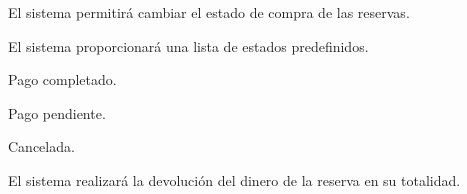\begin{enumitem}[label=\bfseries{RAdm \arabic*.},leftmargin=*]
	\begin{enumitem}[label*=\bfseries{\arabic*.}]
		\item El sistema permitirá cambiar el estado de compra de las reservas.
		\begin{enumitem}[label*=\bfseries{\arabic*.}]
			\item El sistema proporcionará una lista de estados predefinidos.
			\begin{enumitem}[label*=\bfseries{\arabic*.}]
				\item Pago completado.
				\item Pago pendiente.
				\item Cancelada.
				\begin{enumitem}[label*=\bfseries{\arabic*.}]
					\item El sistema realizará la devolución del dinero de la reserva en su totalidad.
				\end{enumitem}
			\end{enumitem}
		\end{enumitem}


\end{enumitem}
\end{enumitem}
